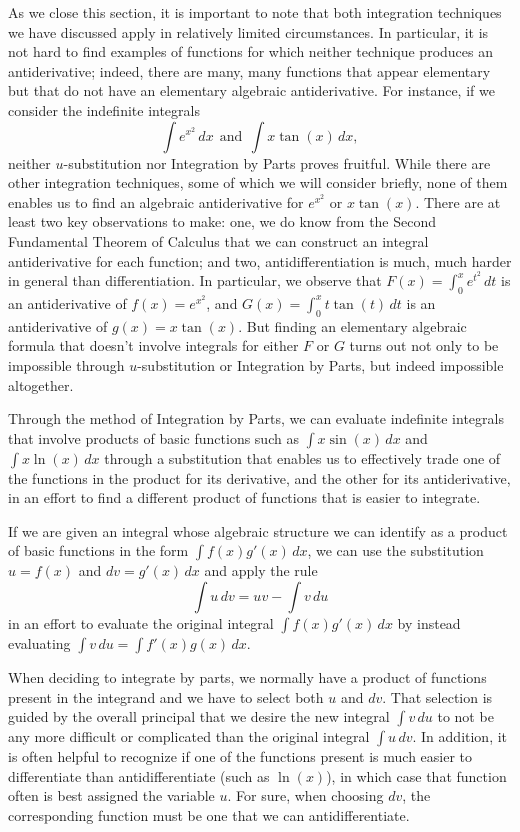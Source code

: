 As we close this section, it is important to note that both integration techniques we have discussed apply in relatively limited circumstances.  In particular, it is not hard to find examples of functions for which neither technique produces an antiderivative; indeed, there are many, many functions that appear elementary but that do not have an elementary algebraic antiderivative.  For instance, if we consider the indefinite integrals
$$\int e^{x^2} \, dx \ \ \mbox{and} \ \ \int x \tan(x) \, dx,$$
neither $u$-substitution nor Integration by Parts proves fruitful.  While there are other integration techniques, some of which we will consider briefly, none of them enables us to find an algebraic antiderivative for $e^{x^2}$ or $x \tan(x)$.  There are at least two key observations to make:  one, we do know from the Second Fundamental Theorem of Calculus that we can construct an integral antiderivative for each function; and two, antidifferentiation is much, much harder in general than differentiation.  In particular, we observe that $F(x) = \int_0^x e^{t^2} \, dt$ is an antiderivative of $f(x) = e^{x^2}$, and $G(x) = \int_0^{x} t \tan(t) \, dt$ is an antiderivative of $g(x) = x \tan(x)$.  But finding an elementary algebraic formula that doesn't involve integrals for either $F$ or $G$ turns out not only to be impossible through $u$-substitution or Integration by Parts, but indeed impossible altogether.

\begin{summary}
\item Through the method of Integration by Parts, we can evaluate indefinite integrals that involve products of basic functions such as $\int x \sin(x) \, dx$ and $\int x \ln(x) \, dx$ through a substitution that enables us to effectively trade one of the functions in the product for its derivative, and the other for its antiderivative, in an effort to find a different product of functions that is easier to integrate.
\item If we are given an integral whose algebraic structure we can identify as a product of basic functions in the form $\int f(x) g'(x) \, dx$, we can use the substitution $u = f(x)$ and $dv = g'(x) \,dx$ and apply the rule
$$\int u \, dv = uv - \int v \, du$$
in an effort to evaluate the original integral $\int f(x) g'(x) \, dx$ by instead evaluating $\int v \, du = \int f'(x) g(x) \, dx$.
\item When deciding to integrate by parts, we normally have a product of functions present in the integrand and we have to select both $u$ and $dv$.  That selection is guided by the overall principal that we desire the new integral $\int v \, du$ to not be any more difficult or complicated than the original integral $\int u \, dv$.  In addition, it is often helpful to recognize if one of the functions present is much easier to differentiate than antidifferentiate (such as $\ln(x)$), in which case that function often is best assigned the variable $u$.  For sure, when choosing $dv$, the corresponding function must be one that we can antidifferentiate.
\end{summary}

\nin \hrulefill

\newpage

 

\clearpage
